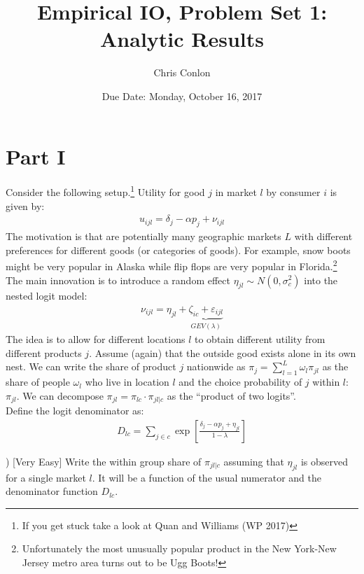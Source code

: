 \documentclass[12pt]{article}
\begin{document}
\title{Empirical IO, Problem Set 1: \\
Analytic Results}
\author{Chris Conlon}
\date{Due Date: Monday, October 16, 2017}
\maketitle

\section*{\normalsize Part I}
Consider the following setup.\footnote{If you get stuck take a look at Quan and Williams (WP 2017)} Utility for good $j$ in market $l$ by consumer $i$ is given by:
\begin{eqnarray*}
u_{ijl} = \delta_j - \alpha p_j + \nu_{ijl}
\end{eqnarray*}
The motivation is that are potentially many geographic markets $L$ with different preferences for different goods (or categories of goods). For example, snow boots might be very popular in Alaska while flip flops are very popular in Florida.\footnote{Unfortunately the most unusually popular product in the New York-New Jersey metro area turns out to be Ugg Boots!}\\

\noindent The main innovation is to introduce a random effect $\eta_{jl} \sim N(0,\sigma_c^2)$ into the nested logit model:
\begin{eqnarray*}
\nu_{ijl} = \eta_{jl}+ \underbrace{\zeta_{ic} + \varepsilon_{ijl}}_{GEV(\lambda)}
\end{eqnarray*}
The idea is to allow for different locations $l$ to obtain different utility from different products $j$. Assume (again) that the outside good exists alone in its own nest. We can write the share of product $j$ nationwide as $\pi_j = \sum_{l=1}^L \omega_l \pi_{jl}$ as the share of people $\omega_l$ who live in location $l$ and the choice probability of $j$ within $l$: $\pi_{jl}$. We can decompose $\pi_{jl} =  \pi_{lc} \cdot \pi_{jl|c}$ as the ``product of two logits''.\\

Define the logit denominator as:
\begin{eqnarray*}
D_{lc} = \sum_{j \in c} \exp \left[\frac{\delta_j  -\alpha p_j+ \eta_{jl}}{1-\lambda}\right]
\end{eqnarray*}

) [Very Easy] Write the within group share of $\pi_{jl | c}$ assuming that $\eta_{jl}$ is observed for a single market $l$. It will be a function of the usual numerator and the denominator function $D_{lc}$.\\
\end{document}
